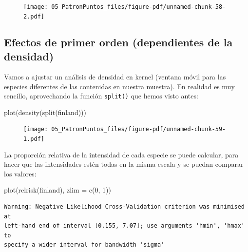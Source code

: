 \documentclass[
  letterpaper,
  DIV=11,
  numbers=noendperiod]{scrreprt}
\newenvironment{Shaded}{\begin{snugshade}}{\end{snugshade}}
\newcommand{\AttributeTok}[1]{\textcolor[rgb]{0.40,0.45,0.13}{#1}}
\newcommand{\DecValTok}[1]{\textcolor[rgb]{0.68,0.00,0.00}{#1}}
\newcommand{\FunctionTok}[1]{\textcolor[rgb]{0.28,0.35,0.67}{#1}}
\newcommand{\NormalTok}[1]{\textcolor[rgb]{0.00,0.23,0.31}{#1}}
\begin{document}
\begin{figure}[H]

{\centering \texttt{[image: 05\_PatronPuntos\_files/figure-pdf/unnamed-chunk-58-2.pdf]}

}

\end{figure}

\hypertarget{efectos-de-primer-orden-dependientes-de-la-densidad}{%
\subsection{Efectos de primer orden (dependientes de la
densidad)}\label{efectos-de-primer-orden-dependientes-de-la-densidad}}

Vamos a ajustar un análisis de densidad en kernel (ventana móvil para
las especies diferentes de las contenidas en nuestra muestra). En
realidad es muy sencillo, aprovechando la función \texttt{split()} que
hemos visto antes:

\begin{Shaded}
\begin{Highlighting}[]
\FunctionTok{plot}\NormalTok{(}\FunctionTok{density}\NormalTok{(}\FunctionTok{split}\NormalTok{(finland)))}
\end{Highlighting}
\end{Shaded}

\begin{figure}[H]

{\centering \texttt{[image: 05\_PatronPuntos\_files/figure-pdf/unnamed-chunk-59-1.pdf]}

}

\end{figure}

La proporción relativa de la intensidad de cada especie se puede
calcular, para hacer que las intensidades estén todas en la misma escala
y se puedan comparar los valores:

\begin{Shaded}
\begin{Highlighting}[]
\FunctionTok{plot}\NormalTok{(}\FunctionTok{relrisk}\NormalTok{(finland), }\AttributeTok{zlim =} \FunctionTok{c}\NormalTok{(}\DecValTok{0}\NormalTok{, }\DecValTok{1}\NormalTok{))}
\end{Highlighting}
\end{Shaded}

\begin{verbatim}
Warning: Negative Likelihood Cross-Validation criterion was minimised at
left-hand end of interval [0.155, 7.07]; use arguments 'hmin', 'hmax' to
specify a wider interval for bandwidth 'sigma'
\end{verbatim}
\end{document}
